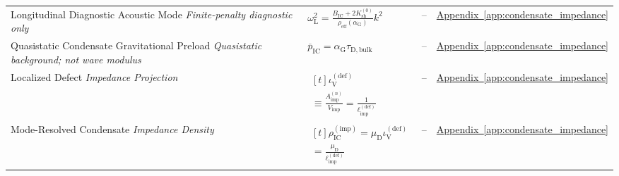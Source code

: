 \begin{longtable}{@{} p{4.5cm} p{6cm} c p{4cm} @{}}
{\raggedright Longitudinal Diagnostic Acoustic Mode \newline \textit{Finite-penalty diagnostic only}\par} & {\raggedright $\omega_{\mathrm L}^2=\frac{B_{\mathrm{IC}}+2K_{\mathrm{sh}}^{(0)}}{\rho_{\mathrm{eff}}(\alpha_{\mathrm G})}k^2$\par} & -- & {\raggedright \hyperref[app:condensate_impedance]{Appendix~\ref*{app:condensate_impedance}}\par} \\

{\raggedright Quasistatic Condensate Gravitational Preload \newline \textit{Quasistatic background; not wave modulus}\par} & {\raggedright $\overline{p}_{\mathrm{IC}} = \alpha_{\mathrm{G}}\tau_{\mathrm{D,bulk}}$\par} & -- & {\raggedright \hyperref[app:condensate_impedance]{Appendix~\ref*{app:condensate_impedance}}\par} \\

{\raggedright Localized Defect \newline \textit{Impedance Projection}\par} & {\raggedright $\begin{gathered}[t]\iota_{\mathrm V}^{(\mathrm{def})} \\ \equiv\frac{A_{\mathrm{imp}}^{(n)}}{V_{\mathrm{imp}}}=\frac1{\ell_{\mathrm{imp}}^{(\mathrm{def})}}\end{gathered}$\par} & -- & {\raggedright \hyperref[app:condensate_impedance]{Appendix~\ref*{app:condensate_impedance}}\par} \\

{\raggedright Mode-Resolved Condensate \newline \textit{Impedance Density}\par} & {\raggedright $\begin{gathered}[t]\rho_{\mathrm{IC}}^{(\mathrm{imp})}=\mu_{\mathrm D}\iota_{\mathrm V}^{(\mathrm{def})} \\ =\frac{\mu_{\mathrm D}}{\ell_{\mathrm{imp}}^{(\mathrm{def})}}\end{gathered}$\par} & -- & {\raggedright \hyperref[app:condensate_impedance]{Appendix~\ref*{app:condensate_impedance}}\par} \\


\end{longtable}
